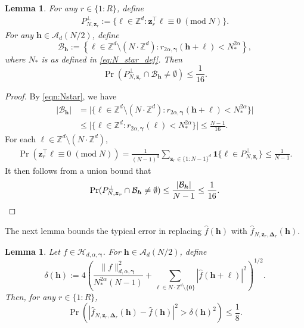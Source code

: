 \documentclass[a4paper,11pt]{article}
\newtheorem{lemma}[theorem]{Lemma}
\newcommand{\bszero}{\boldsymbol{0}}
\newcommand{\bsh}{\boldsymbol{h}}
\newcommand{\bsl}{\boldsymbol{\ell}}
\newcommand{\bsz}{\boldsymbol{z}}
\newcommand{\bsgamma}{\boldsymbol{\gamma}}
\newcommand{\bsDelta}{\boldsymbol{\Delta}}
\newcommand{\ZZ}{\mathbb{Z}}
\newcommand{\Acal}{\mathcal{A}}
\newcommand{\Bcal}{\mathcal{B}}
\newcommand{\Hcal}{\mathcal{H}}
\newcommand{\tmod}[1]{{\;(\mathrm{mod}\; #1)}}
\begin{document}
\begin{lemma}\label{lem:nointersect}
For any $r\in\{1{:}R\}$, define
\begin{align}\label{eq:def_dual_lattice}
P_{N,\bsz_r}^\perp := \{\bsl \in \ZZ^d : \bsz_r^\top \bsl \equiv 0 \tmod N\}.
\end{align}
For any $\bsh \in \Acal_d(N/2)$, define
\[
\Bcal_{\bsh} := \left\{ \bsl \in \ZZ^d \setminus (N \cdot \ZZ^d) : r_{2\alpha,\bsgamma}(\bsh+\bsl) < N_*^{2\alpha} \right\},
\]
where $N_*$ is as defined in \eqref{eq:N_star_def}. Then
\[
\Pr(P_{N,\bsz_r}^\perp \cap \Bcal_{\bsh} \neq \emptyset) \le \frac{1}{16}.
\]
\end{lemma}
\begin{proof} 
By \eqref{eqn:Nstar}, we have
\begin{align*}
|\Bcal_{\bsh}| 
&= \Big| \big\{ \bsl \in \ZZ^d \setminus (N\cdot \ZZ^d) : r_{2\alpha,\bsgamma}(\bsh+\bsl) < N_*^{2\alpha} \big\} \Big| \\
&\le \Big| \big\{ \bsl \in \ZZ^d : r_{2\alpha,\bsgamma}(\bsl) < N_*^{2\alpha} \big\} \Big| \le \frac{N-1}{16}.
\end{align*}
For each $\bsl \in \ZZ^d \setminus (N \cdot \ZZ^d)$, 
\begin{align}\label{eqn:ellinP}
\Pr(\bsz_r^\top \bsl \equiv 0 \tmod N) = \frac{1}{(N-1)^d} \sum_{\bsz_r \in \{1{:}N-1\}^d} \mathbf{1}\{\bsl \in P_{N,\bsz_r}^\perp\} \le \frac{1}{N-1}.
\end{align}
It then follows from a union bound that
\[
\Pr(P_{N,\bsz_r}^\perp \cap \Bcal_{\bsh} \neq \emptyset) 
\le \frac{|\Bcal_{\bsh}|}{N-1} \le \frac{1}{16}. \qedhere
\]
\end{proof}

The next lemma bounds the typical error in replacing $\widehat{f}(\bsh)$ with $\widehat{f}_{N,\bsz_r,\bsDelta_r}(\bsh)$.

\begin{lemma}\label{lem:concentration}
Let $f \in \Hcal_{d,\alpha,\bsgamma}$. For 
$\bsh \in \Acal_d(N/2)$, define
\[
\delta(\bsh) := 4 \left( \frac{\|f\|^2_{d,\alpha,\bsgamma}}{N_*^{2\alpha}(N-1)} + \sum_{\bsl \in N \cdot \ZZ^d \setminus \{\bszero\}} |\widehat{f}(\bsh+\bsl)|^2 \right)^{1/2}.
\]
Then, for any $r \in \{1{:}R\}$,
\[
\Pr\left( |\widehat{f}_{N,\bsz_r,\bsDelta_r}(\bsh) - \widehat{f}(\bsh)|^2 > \delta(\bsh)^2 \right) \le \frac{1}{8}.
\]
\end{lemma}
\end{document}
